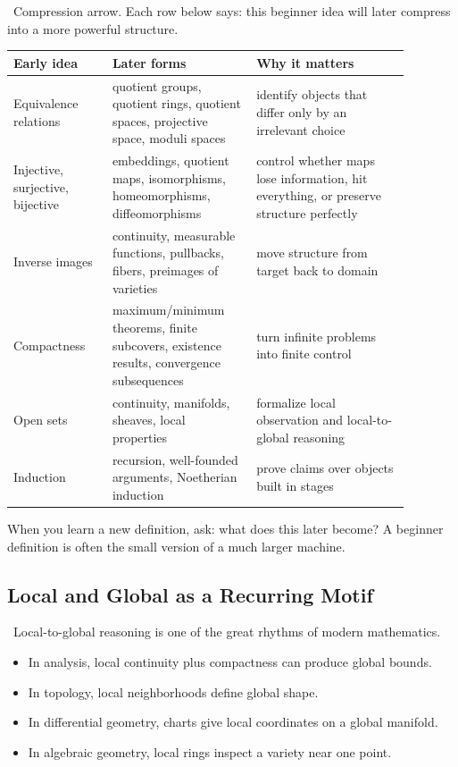 \begin{marginnotebox}
\motifcompression\ Compression arrow. Each row below says: this beginner idea
will later compress into a more powerful structure.
\end{marginnotebox}

\begin{longtable}{p{0.22\linewidth}p{0.32\linewidth}p{0.34\linewidth}}
\toprule
Early idea & Later forms & Why it matters \\
\midrule
Equivalence relations & quotient groups, quotient rings, quotient spaces, projective space, moduli spaces & identify objects that differ only by an irrelevant choice \\
Injective, surjective, bijective & embeddings, quotient maps, isomorphisms, homeomorphisms, diffeomorphisms & control whether maps lose information, hit everything, or preserve structure perfectly \\
Inverse images & continuity, measurable functions, pullbacks, fibers, preimages of varieties & move structure from target back to domain \\
Compactness & maximum/minimum theorems, finite subcovers, existence results, convergence subsequences & turn infinite problems into finite control \\
Open sets & continuity, manifolds, sheaves, local properties & formalize local observation and local-to-global reasoning \\
Induction & recursion, well-founded arguments, Noetherian induction & prove claims over objects built in stages \\
\bottomrule
\end{longtable}

\begin{walkbox}
When you learn a new definition, ask: what does this later become? A beginner
definition is often the small version of a much larger machine.
\end{walkbox}

\subsection{Local and Global as a Recurring Motif}

\motiflocalglobal\ Local-to-global reasoning is one of the great rhythms of
modern mathematics.

\begin{itemize}
\item In analysis, local continuity plus compactness can produce global bounds.
\item In topology, local neighborhoods define global shape.
\item In differential geometry, charts give local coordinates on a global manifold.
\item In algebraic geometry, local rings inspect a variety near one point.
\end{itemize}

